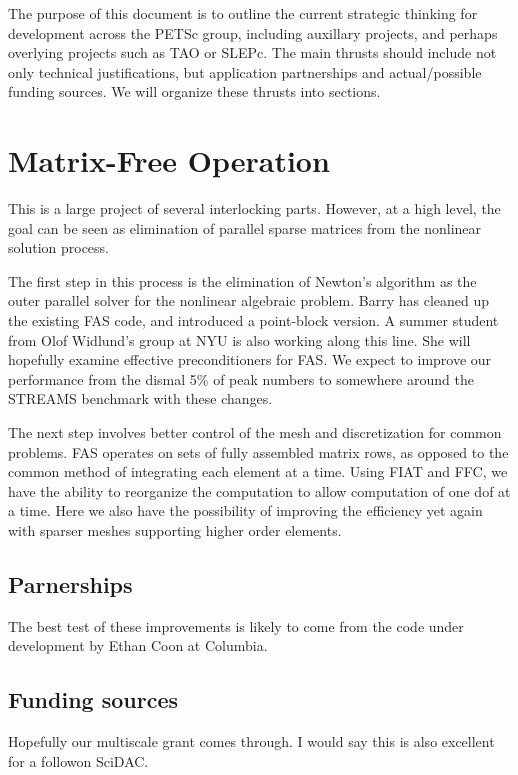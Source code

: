 	The purpose of this document is to outline the current strategic thinking for development across the PETSc
group, including auxillary projects, and perhaps overlying projects such as TAO or SLEPc. The main thrusts should
include not only technical justifications, but application partnerships and actual/possible funding sources. We will
organize these thrusts into sections.

\section{Matrix-Free Operation}

	This is a large project of several interlocking parts. However, at a high level, the goal can be seen as
elimination of parallel sparse matrices from the nonlinear solution process.

	The first step in this process is the elimination of Newton's algorithm as the outer parallel solver for the
nonlinear algebraic problem. Barry has cleaned up the existing FAS code, and introduced a point-block version. A summer
student from Olof Widlund's group at NYU is also working along this line. She will hopefully examine effective
preconditioners for FAS. We expect to improve our performance from the dismal 5\% of peak numbers to somewhere around
the STREAMS benchmark with these changes.

	The next step involves better control of the mesh and discretization for common problems. FAS operates on sets
of fully assembled matrix rows, as opposed to the common method of integrating each element at a time. Using FIAT and
FFC, we have the ability to reorganize the computation to allow computation of one dof at a time. Here we also have the
possibility of improving the efficiency yet again with sparser meshes supporting higher order elements.

  \subsection{Parnerships}

	The best test of these improvements is likely to come from the code under development by Ethan Coon at Columbia.

  \subsection{Funding sources}

	Hopefully our multiscale grant comes through. I would say this is also excellent for a followon SciDAC.

